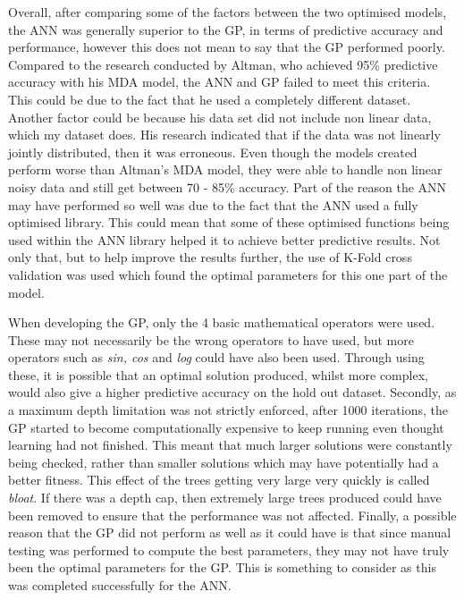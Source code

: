 \documentclass[11pt]{article}
\begin{document}
Overall, after comparing some of the factors between the two optimised models, the ANN was generally superior to the GP, in terms of predictive accuracy and performance, however this does not mean to say that the GP performed poorly. Compared to the research conducted by Altman, who achieved 95\% predictive accuracy with his MDA model, the ANN and GP failed to meet this criteria. This could be due to the fact that he used a completely different dataset. Another factor could be because his data set did not include non linear data, which my dataset does. His research indicated that if the data was not linearly jointly distributed, then it was erroneous. Even though the models created perform worse than Altman's MDA model, they were able to handle non linear noisy data and still get between 70 - 85\% accuracy. 
Part of the reason the ANN may have performed so well was due to the fact that the ANN used a fully optimised library. This could mean that some of these optimised functions being used within the ANN library helped it to achieve better predictive results. 
Not only that, but to help improve the results further, the use of K-Fold cross validation was used which found the optimal parameters for this one part of the model. 

When developing  the GP, only the 4 basic mathematical operators were used. These may not necessarily be the wrong operators to have used, but more operators such as \textit{sin, cos} and \textit{log} could have also been used. Through using these, it is possible that an optimal solution produced, whilst more complex, would also give a higher predictive accuracy on the hold out dataset.  Secondly, as a maximum depth limitation was not strictly enforced, after 1000 iterations, the GP started to become computationally expensive to keep running even thought learning had not finished. This meant that much larger solutions were constantly being checked, rather than smaller solutions which may have potentially had a better fitness. This effect of the trees getting very large very quickly is called \textit{bloat}. If there was a depth cap, then extremely large trees produced could have been removed to ensure that the performance was not affected. Finally, a possible reason that the GP did not perform as well as it could have is that since manual testing was performed to compute the best parameters, they may not have truly been the optimal parameters for the GP. This is something to consider as this was completed successfully for the ANN. \\
\end{document}
